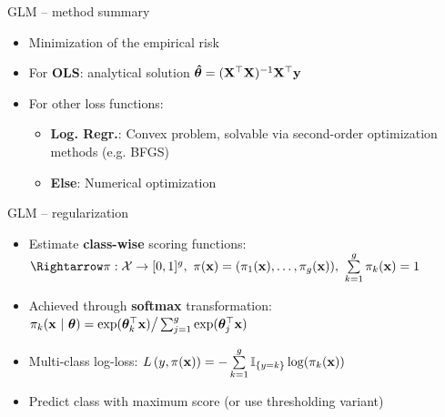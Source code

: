 \begin{frame2}{GLM -- method summary}


\begin{itemize}
    \item Minimization of the empirical risk
    \item For \textbf{OLS}: analytical solution $\bm{\hat\theta} = (\mathbf{X}^\top \mathbf{X})^{-1} \mathbf{X}^\top \mathbf{y}$
    \item For other loss functions: 
    \begin{itemize}
        \item \textbf{Log. Regr.}: Convex problem, solvable via second-order optimization methods (e.g. BFGS)
        \item \textbf{Else}: Numerical optimization 
    \end{itemize}
    
\end{itemize}

\medskip




\end{frame2}


\begin{frame2}{GLM -- regularization}


\begin{itemize}
  \item Estimate \textbf{class-wise} scoring functions:
  $\Rightarrow \pi: \Xspace \rightarrow \unitint^g, ~
  \pix = (\pikx[1], \dots, \pikx[g]), ~\sumkg \pikx = 1$
  \item Achieved through \textbf{softmax} transformation: 
  $\pi_{k}(\mathbf{x} ~|~ \bm{\theta}) = \exp(\bm{\theta}_k^\top \mathbf{x}) \big/ \sum_{j=1}^g \exp(\bm{\theta}_j^\top 
  \mathbf{x})  $
  \item Multi-class log-loss: $L\left(y, \pi(\mathbf{x})\right) = - \sum\limits_{k=1}^g \mathbb{I}_{\{y = k\}} \log(\pi_{k}(\mathbf{x}))$
  \item Predict class with maximum score (or use thresholding variant)
\end{itemize}
\end{frame2}

